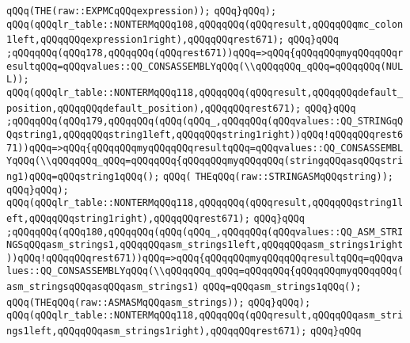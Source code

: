 \verb|qQQq(THE(raw::EXPMCqQQqexpression));|\newline
\verb|qQQq}qQQq);|\newline
\verb|qQQq(qQQqlr_table::NONTERMqQQq108,qQQqqQQq(qQQqresult,qQQqqQQqmc_colon1left,qQQqqQQqexpression1right),qQQqqQQqrest671);|\newline
\verb|qQQq}qQQq|\newline
\verb|;qQQqqQQq(qQQq178,qQQqqQQq(qQQqrest671))qQQq=>qQQq{qQQqqQQqmyqQQqqQQqresultqQQq=qQQqvalues::QQ_CONSASSEMBLYqQQq(\\qQQqqQQq_qQQq=qQQqqQQq(NULL));|\newline
\verb|qQQq(qQQqlr_table::NONTERMqQQq118,qQQqqQQq(qQQqresult,qQQqqQQqdefault_position,qQQqqQQqdefault_position),qQQqqQQqrest671);|\newline
\verb|qQQq}qQQq|\newline
\verb|;qQQqqQQq(qQQq179,qQQqqQQq(qQQq(qQQq_,qQQqqQQq(qQQqvalues::QQ_STRINGqQQqstring1,qQQqqQQqstring1left,qQQqqQQqstring1right))qQQq!qQQqqQQqrest671))qQQq=>qQQq{qQQqqQQqmyqQQqqQQqresultqQQq=qQQqvalues::QQ_CONSASSEMBLYqQQq(\\qQQqqQQq_qQQq=qQQqqQQq{qQQqqQQqmyqQQqqQQq(stringqQQqasqQQqstring1)qQQq=qQQqstring1qQQq();|\newline
\verb|qQQq(|\newline
\verb|THEqQQq(raw::STRINGASMqQQqstring));|\newline
\verb|qQQq}qQQq);|\newline
\verb|qQQq(qQQqlr_table::NONTERMqQQq118,qQQqqQQq(qQQqresult,qQQqqQQqstring1left,qQQqqQQqstring1right),qQQqqQQqrest671);|\newline
\verb|qQQq}qQQq|\newline
\verb|;qQQqqQQq(qQQq180,qQQqqQQq(qQQq(qQQq_,qQQqqQQq(qQQqvalues::QQ_ASM_STRINGSqQQqasm_strings1,qQQqqQQqasm_strings1left,qQQqqQQqasm_strings1right))qQQq!qQQqqQQqrest671))qQQq=>qQQq{qQQqqQQqmyqQQqqQQqresultqQQq=qQQqvalues::QQ_CONSASSEMBLYqQQq(\\qQQqqQQq_qQQq=qQQqqQQq{qQQqqQQqmyqQQqqQQq(asm_stringsqQQqasqQQqasm_strings1)|\newline
\verb|qQQq=qQQqasm_strings1qQQq();|\newline
\verb|qQQq(THEqQQq(raw::ASMASMqQQqasm_strings));|\newline
\verb|qQQq}qQQq);|\newline
\verb|qQQq(qQQqlr_table::NONTERMqQQq118,qQQqqQQq(qQQqresult,qQQqqQQqasm_strings1left,qQQqqQQqasm_strings1right),qQQqqQQqrest671);|\newline
\verb|qQQq}qQQq|\newline
